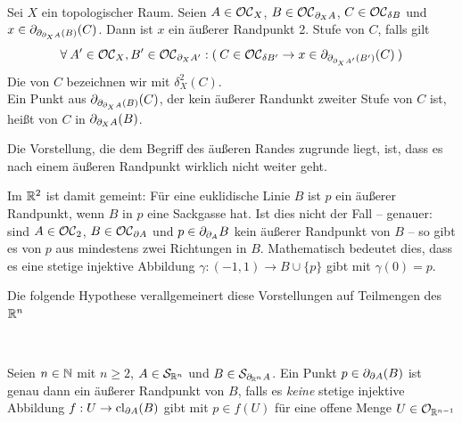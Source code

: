    \begin{dfn}\label{def:aeusserer-rand-2} \ \vspace{8pt}

        \noindent
        Sei $X$ ein topologischer Raum.
        Seien $A \in \mathcal{OC}_X$, $B \in \mathcal{OC}_{\partial_X A}$, $C \in \mathcal{OC}_{\delta B}$ und $x \in \partial_{\partial_{\partial_X A}(B)}(C)$. Dann ist $x$ ein äußerer Randpunkt 2. Stufe von $C$, falls gilt
        \begin{align*}
            \forall\: A' \in \mathcal{OC}_X, B' \in \mathcal{OC}_{\partial_X A'} : (\: C \in \mathcal{OC}_{\delta B'} \rightarrow x \in \partial_{\partial_{\partial_X A'}(B')}(C) \:)
        \end{align*}
        Die  von $C$ bezeichnen wir mit $\delta_X^2(C)$.\\
        Ein Punkt aus $\partial_{\partial_{\partial_X A}(B)}(C)$, der kein äußerer Randunkt zweiter Stufe von $C$ ist, heißt  von $C$ in $\partial_{\partial_X A}(B)$.
    \end{dfn}
    
    Die Vorstellung, die dem Begriff des äußeren Randes zugrunde liegt, ist, dass es nach einem äußeren Randpunkt \glqq wirklich nicht weiter geht\grqq.
    

    Im
    $\mathbb{R}^2$ ist damit gemeint:
    Für eine euklidische Linie $B$ ist $p$ ein äußerer Randpunkt, wenn $B$ in $p$ eine Sackgasse hat.
    Ist dies nicht der Fall -- genauer: sind $A \in \mathcal{OC}_2$, $B \in \mathcal{OC}_{\partial A}$ und $p \in \partial_{\partial_A} B$ kein äußerer Randpunkt von $B$ -- so gibt es von $p$ aus mindestens zwei Richtungen in $B$.
    Mathematisch bedeutet dies, dass es eine stetige injektive Abbildung $\gamma:(-1,1) \to B \cup \{p\}$ gibt mit $\gamma(0) = p$.
    
    Die
    folgende Hypothese verallgemeinert diese Vorstellungen auf Teilmengen des $\mathbb{R}^n$

    \begin{hyp}\label{hyp:aeusserer-rand} \ \vspace{8pt}

        \noindent
        Seien $n \in \mathbb{N}$ mit $n \geq 2$, $A \in \mathcal{S}_{\mathbb{R}^n}$ und $B \in \mathcal{S}_{\partial_{\mathbb{R}^n} A}$. Ein Punkt $p \in \partial_{\partial A}(B)$ ist genau dann ein äußerer Randpunkt von $B$, falls es \textit{keine} stetige injektive Abbildung $f : U \to \text{cl}_{\partial A}(B)$ gibt mit $p \in f(U)$ für eine offene Menge $U \in \mathcal{O}_{\mathbb{R}^{n-1}}$
    \end{hyp}
    
